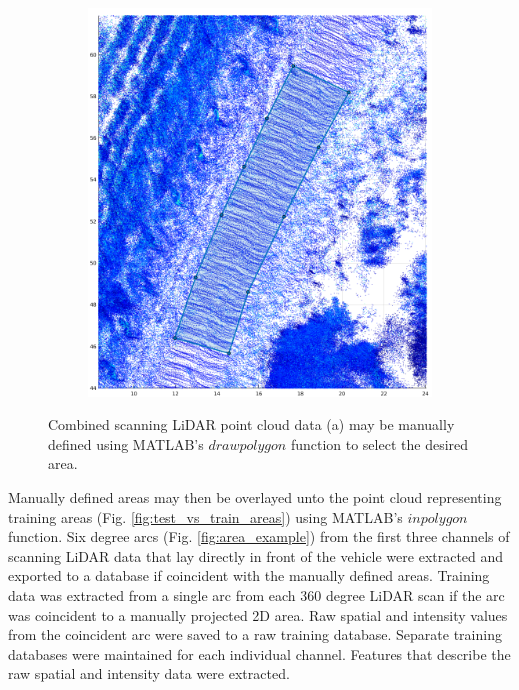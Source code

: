 \documentclass[numbered,pdftex]{ohio-etd}
\begin{document}
{{{{\begin{figure}[H]
\begin{subfigure}{0.45\textwidth}
						\includegraphics[width=1.0\linewidth]{Defense_Images/area_selected}
						\caption[Selected Road area on Point Cloud]{}
						\label{fig:area_selected}
					\end{subfigure}
					\caption[Manual Area Selection Process]{Combined scanning LiDAR point cloud data (a) may be manually defined using MATLAB's $drawpolygon$ function to select the desired area. }
					\label{fig:Area_Selection_Process}
				\end{figure}
			
				{Manually defined areas may then be overlayed unto the point cloud representing training areas (Fig. \ref{fig:test_vs_train_areas}) using MATLAB's $inpolygon$ function. Six degree arcs (Fig. \ref{fig:area_example}) from the first three channels of scanning LiDAR data that lay directly in front of the vehicle were extracted and exported to a database if coincident with the manually defined areas. Training data was extracted from a single arc from each 360 degree LiDAR scan if the arc was coincident to a manually projected 2D area. Raw spatial and intensity values from the coincident arc were saved to a raw training database. Separate training databases were maintained for each individual channel. Features that describe the raw spatial and intensity data were extracted. }
				
}}}}
\end{document}
